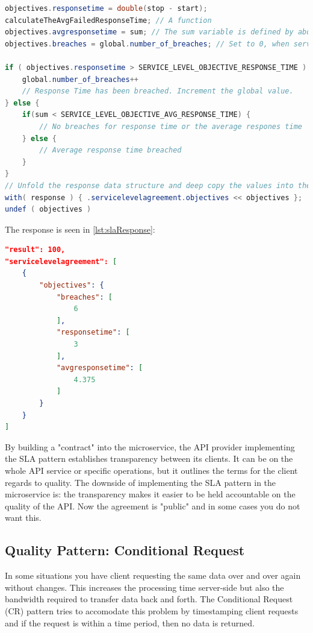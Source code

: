 \documentclass[12pt]{article}
\begin{document}
\begin{lstlisting}[caption=slaOperation, captionpos=b, language=java, label=slaOperation, frame=single]
objectives.responsetime = double(stop - start);
calculateTheAvgFailedResponseTime; // A function
objectives.avgresponsetime = sum; // The sum variable is defined by above executed function
objectives.breaches = global.number_of_breaches; // Set to 0, when service is initialized

if ( objectives.responsetime > SERVICE_LEVEL_OBJECTIVE_RESPONSE_TIME ) {
    global.number_of_breaches++
    // Response Time has been breached. Increment the global value. 
} else {
    if(sum < SERVICE_LEVEL_OBJECTIVE_AVG_RESPONSE_TIME) {
        // No breaches for response time or the average respones time
    } else {
        // Average response time breached
    }
}
// Unfold the response data structure and deep copy the values into the tree
with( response ) { .servicelevelagreement.objectives << objectives };
undef ( objectives )
\end{lstlisting}

The response is seen in \ref{lst:slaResponse}:

\begin{lstlisting}[caption=The response to the client when a calculation is requested, 
captionpos=b, language=json, label=slaResponse]
"result": 100,
"servicelevelagreement": [
    {
        "objectives": {
            "breaches": [
                6
            ],
            "responsetime": [
                3
            ],
            "avgresponsetime": [
                4.375
            ]
        }
    }
]
\end{lstlisting}

By building a "contract" into the microservice, the API provider implementing the SLA pattern establishes transparency between its clients. It can be on the whole API service or specific operations, but it outlines the terms for the client regards to quality. The downside of implementing the SLA pattern in the microservice is: the transparency makes it easier to be held accountable on the quality of the API. Now the agreement is "public" and in some cases you do not want this.

\subsection{Quality Pattern: Conditional Request}
In some situations you have client requesting the same data over and over again without changes. This increases the processing time server-side but also the bandwidth required to transfer data back and forth. The Conditional Request (CR) pattern tries to accomodate this problem by timestamping client requests and if the request is within a time period, then no data is returned. \\
\end{document}
